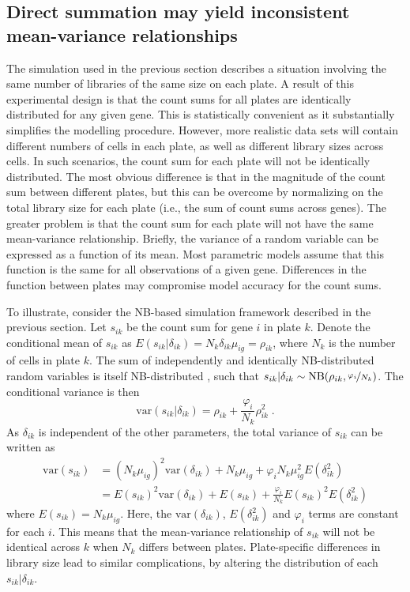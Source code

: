 \documentclass{article}
\begin{document}
\subsection{Direct summation may yield inconsistent mean-variance relationships}
The simulation used in the previous section describes a situation involving the same number of libraries of the same size on each plate.
A result of this experimental design is that the count sums for all plates are identically distributed for any given gene.
This is statistically convenient as it substantially simplifies the modelling procedure.
However, more realistic data sets will contain different numbers of cells in each plate, as well as different library sizes across cells.
In such scenarios, the count sum for each plate will not be identically distributed.
The most obvious difference is that in the magnitude of the count sum between different plates, 
    but this can be overcome by normalizing on the total library size for each plate (i.e., the sum of count sums across genes).
The greater problem is that the count sum for each plate will not have the same mean-variance relationship.
Briefly, the variance of a random variable can be expressed as a function of its mean.
Most parametric models assume that this function is the same for all observations of a given gene.
Differences in the function between plates may compromise model accuracy for the count sums.

To illustrate, consider the NB-based simulation framework described in the previous section.
Let $s_{ik}$ be the count sum for gene $i$ in plate $k$.
Denote the conditional mean of $s_{ik}$ as $E(s_{ik}|\delta_{ik})=N_k \delta_{ik}\mu_{ig} = \rho_{ik}$, where $N_k$ is the number of cells in plate $k$.
The sum of independently and identically NB-distributed random variables is itself NB-distributed \cite{robinson2008small}, 
    such that $s_{ik} |\delta_{ik} \sim \mbox{NB}(\rho_{ik}, \nicefrac{\varphi_{i}}{N_k})$.
The conditional variance is then
\[
    \mbox{var}(s_{ik} |\delta_{ik}) = \rho_{ik} + \frac{\varphi_{i}}{N_k}\rho_{ik}^2 \;.
\]
As $\delta_{ik}$ is independent of the other parameters, the total variance of $s_{ik}$ can be written as
\begin{align}
    \mbox{var}(s_{ik}) &= (N_k\mu_{ig})^2\mbox{var}(\delta_{ik}) + N_k\mu_{ig} + \varphi_{i} N_k\mu_{ig}^2 E(\delta_{ik}^2) \nonumber \\ 
                       &= E(s_{ik})^2 \mbox{var}(\delta_{ik}) + E(s_{ik}) + \frac{\varphi_{i}}{N_k} E(s_{ik})^2 E(\delta_{ik}^2) 
    \label{eqn:meanvar}
\end{align}
where $E(s_{ik})=N_k\mu_{ig}$. 
Here, the $\mbox{var}(\delta_{ik})$, $E(\delta_{ik}^2)$ and $\varphi_{i}$ terms are constant for each $i$.
This means that the mean-variance relationship of $s_{ik}$ will not be identical across $k$ when $N_k$ differs between plates.
Plate-specific differences in library size lead to similar complications, by altering the distribution of each $s_{ik} |\delta_{ik}$.
\end{document}
